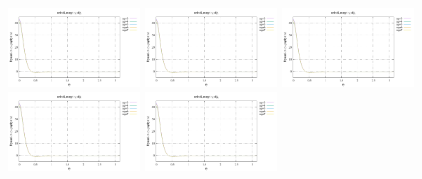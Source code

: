 \noindent
\includegraphics[width=3.5cm]{python_codes/fieldstone_152/RESULTS/exp2/d_t_16_m2}
\includegraphics[width=3.5cm]{python_codes/fieldstone_152/RESULTS/exp2/d_t_16_m3}
\includegraphics[width=3.5cm]{python_codes/fieldstone_152/RESULTS/exp2/d_t_16_m4}
\includegraphics[width=3.5cm]{python_codes/fieldstone_152/RESULTS/exp2/d_t_16_m5}
\includegraphics[width=3.5cm]{python_codes/fieldstone_152/RESULTS/exp2/d_t_16_m6}


